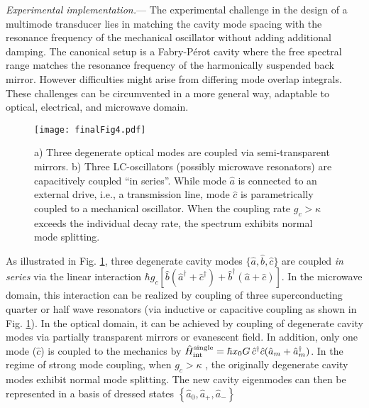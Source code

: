 \documentclass[twocolumn,english,aps,prl,superscriptaddress,showpacs,preprintnumbers]{revtex4}
\begin{document}
\textit{Experimental implementation.}--- The experimental challenge
in the design of a multimode transducer lies in matching the cavity
mode spacing with the resonance frequency of the mechanical oscillator without adding additional
damping. The canonical setup is a Fabry-Pérot cavity where the free
spectral range matches the resonance frequency of the harmonically
suspended back mirror. However difficulties might arise from differing
mode overlap integrals. These challenges can be circumvented in a more general
way, adaptable to optical, electrical, and microwave domain.\begin{figure}
\begin{centering}
\texttt{[image: finalFig4.pdf]} 
\par\end{centering}

\caption{a) Three degenerate optical modes are coupled via semi-transparent
mirrors. b) Three LC-oscillators (possibly microwave resonators) are
capacitively coupled {}``in series''. While mode $\hat{a}$ is connected
to an external drive, i.e., a transmission line, mode $\hat{c}$ is
parametrically coupled to a mechanical oscillator. When the coupling
rate $g_{c}>\kappa$ exceeds the individual decay rate, the spectrum
exhibits normal mode splitting. \label{fig:3}}

\end{figure}
As illustrated in Fig. \ref{fig:3}, three degenerate cavity modes $\{\hat{a},\hat{b},\hat{c}\}$
are coupled \textit{in series} via the linear interaction $\hbar g_{c}\left[\hat{b}(\hat{a}^{\dagger}+\hat{c}^{\dagger})+\hat{b}^{\dagger}(\hat{a}+\hat{c})\right]$.
In the microwave domain, this interaction can be realized by coupling
of three superconducting quarter or half wave resonators (via inductive
or capacitive coupling as shown in Fig. \ref{fig:3}). In the optical
domain, it can be achieved by coupling of degenerate cavity modes via partially transparent mirrors or evanescent field.
In addition, only one mode ($\hat{c}$) is coupled to the mechanics
by $\hat{H}_{{\rm int}}^{{\rm single}}=\hbar x_{0}G\,\hat{c}^{\dagger}\hat{c}(\hat{a}_{m}+\hat{a}_{m}^{\dagger})$.
In the regime of strong mode coupling, when $g_{c}>\kappa$ , the
originally degenerate cavity modes exhibit normal mode splitting. The new cavity
eigenmodes can then be represented in a basis of dressed states $\left\{ \hat{a}_{0},\hat{a}_{+},\hat{a}_{-}\right\} $
\end{document}
